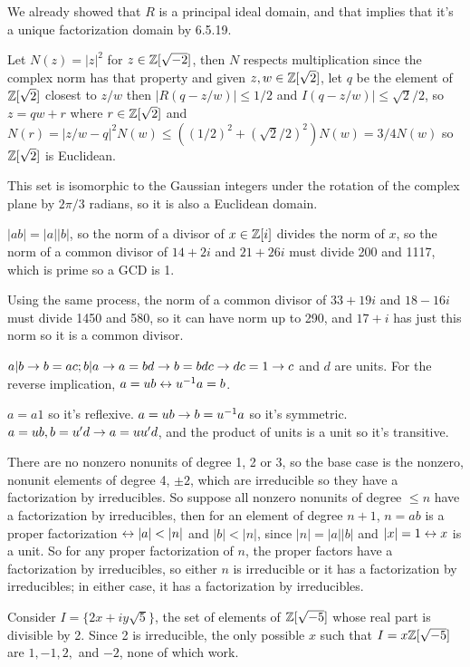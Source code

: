 \documentclass[11pt, oneside]{article}   	%
\begin{document}
\ee
\item We already showed that $R$ is a principal ideal domain, and that implies that it's a unique factorization domain by 6.5.19.
\item Let $N(z) = |z|^2$ for $z \in \mathbb{Z}[\sqrt{-2}]$, then $N$ respects multiplication since the complex norm has that property and given $z, w \in \mathbb{Z}[\sqrt{\-2}]$, let $q$ be the element of $ \mathbb{Z}[\sqrt{\-2}]$ closest to $z/w$ then $|R(q-z/w)| \le 1/2$ and $I(q-z/w)| \le \sqrt{2}/2$, so $z = qw + r$ where $r \in  \mathbb{Z}[\sqrt{\-2}]$ and $N(r) = |z/w-q|^2N(w) \le ((1/2)^2 + (\sqrt{2}/2)^2)N(w) = 3/4 N(w)$ so $ \mathbb{Z}[\sqrt{\-2}]$ is Euclidean.
\item This set is isomorphic to the Gaussian integers under the rotation of the complex plane by $2\pi/3$ radians, so it is also a Euclidean domain.
\item $|ab| = |a||b|$, so the norm of a divisor of $x \in \mathbb{Z}[i]$ divides the norm of $x$, so the norm of a common divisor of $14 + 2i$ and $21 + 26i$ must divide 200 and 1117, which is prime so a GCD is 1.
\item Using the same process, the norm of a common divisor of $33 + 19i$ and $18-16i$ must divide 1450 and 580, so it can have norm up to 290, and $17+i$ has just this norm so it is a common divisor.
\item $a | b \rightarrow b = ac; b | a \rightarrow a = bd \rightarrow b = bdc \rightarrow dc = 1 \rightarrow c$ and $d$ are units. For the reverse implication, $a = ub \leftrightarrow u^{-1} a = b$.
\item $a = a1$ so it's reflexive. $a = ub \rightarrow b = u^{-1} a$ so it's symmetric. $a = ub, b = u'd \rightarrow a = uu'd$, and the product of units is a unit so it's transitive.
\item There are no nonzero nonunits of degree 1, 2 or 3, so the base case is the nonzero, nonunit elements of degree 4, $\pm2$, which are irreducible so they have a factorization by irreducibles. So suppose all nonzero nonunits of degree $\le n$ have a factorization by irreducibles, then for an element of degree $n+1$, $n=ab$ is a proper factorization $\leftrightarrow |a| < |n|$ and $|b| < |n|$, since $|n| = |a||b|$ and $|x| = 1 \leftrightarrow x $ is a unit. So for any proper factorization of $n$, the proper factors have a factorization by irreducibles, so either $n$ is irreducible or it has a factorization by irreducibles; in either case, it has a factorization by irreducibles. 
\item Consider $I = \{2x + iy\sqrt{5}\}$, the set of elements of $\mathbb{Z}[\sqrt{-5}]$ whose real part is divisible by 2. Since 2 is irreducible, the only possible $x$ such that $I = x\mathbb{Z}[\sqrt{-5}]$ are $1, -1, 2, $ and $-2$, none of which work.
\end{document}
